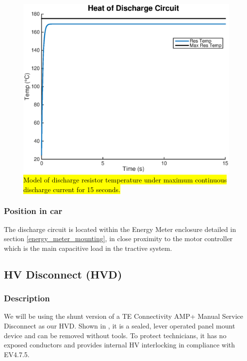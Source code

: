 \documentclass{article}
\DeclareRobustCommand{\hlr}[1]{{\sethlcolor{pink}\hl{#1}}}
\begin{document}
\begin{figure}[H]
    \centering
    \includegraphics[width = 0.7 \textwidth]{discharge_heat}
    \caption{\hlr{Model of discharge resistor temperature under maximum continuous discharge current for 15 seconds.}}
    \label{discharge_heat}
\end{figure}



\subsubsection{Position in car}
The discharge circuit is located within the Energy Meter enclosure detailed in section \ref{energy_meter_mounting}, in close proximity to the motor controller which is the main capacitive load in the tractive system. 

\subsection{HV Disconnect (HVD)}\label{hv_disconnect}
\subsubsection{Description}
We will be using the shunt version of a TE Connectivity AMP+ Manual Service Disconnect as our HVD. Shown in , it is a sealed, lever operated panel mount device and can be removed without tools. To protect technicians, it has no exposed conductors and provides internal HV interlocking in compliance with EV4.7.5. 
\end{document}
